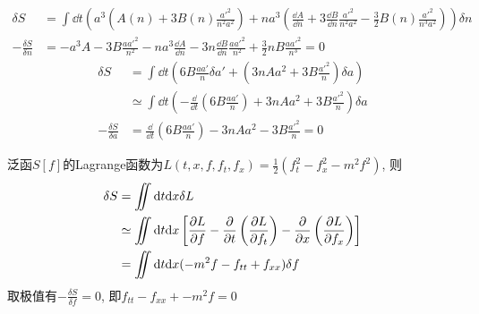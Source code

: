 \begin{solution}
    \[
        \begin{aligned}
            \delta S & = \int \dd t \left(a^3\left(A(n) + 3B(n) \frac{a'^2}{n^2 a^2}\right) + n a^3 \left(\frac{\dd A}{\dd n} + 3\frac{\dd B}{\dd n}\frac{a'^2}{n^2 a^2} - \frac{3}{2}B(n)\frac{a'^2}{n^3 a^2}\right)\right) \delta n\\
            -\frac{\delta S}{\delta n} & = -a^3 A - 3B \frac{a a'^2}{n^2} - n a^3 \frac{\dd A}{\dd n} - 3n \frac{\dd B}{\dd n} \frac{a a'^2}{n^2} + \frac{3}{2}nB\frac{a a'^2}{n^3} = 0
        \end{aligned}
    \]
    \[
        \begin{aligned}
            \delta S & = \int \dd t \left(6 B \frac{a a'}{n} \delta a' + \left(3 n A a^2 + 3 B \frac{a'^2}{n}\right)\delta a\right) \\
            & \simeq \int \dd t \left(- \frac{\dd}{\dd t}\left(6 B \frac{a a'}{n}\right) + 3 n A a^2 + 3 B \frac{a'^2}{n}\right) \delta a \\
            - \frac{\delta S}{\delta a} & = \frac{\dd}{\dd t}\left(6 B \frac{a a'}{n}\right) - 3 n A a^2 - 3 B \frac{a'^2}{n} = 0
        \end{aligned}
    \]
\end{solution}

\begin{solution}
    泛函\(S[f]\)的Lagrange函数为\(L(t,x,f,f_t,f_x) = \frac12(f_t^2-f_x^2-m^2f^2)\), 则
    \[
    \begin{aligned}
        \delta S & = \iint \dd t \dd x \delta L \\
                 & \simeq \iint \dd t \dd x \left[
                    \frac{\partial L}{\partial f} - \frac{\partial}{\partial t}\left( \frac{\partial L}{\partial f_t} \right) - \frac{\partial}{\partial x}\left( \frac{\partial L}{\partial f_x} \right)
                    \right] \\
                 & = \iint \dd t \dd x  
                 (-m^2f - f_{tt} + f_{xx})
                 \delta f
    \end{aligned}
    \]
    取极值有\(-\frac{\delta S}{\delta f}=0\), 即\(f_{tt} - f_{xx} + -m^2f = 0\)
\end{solution}

